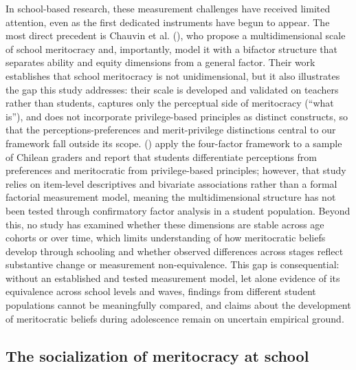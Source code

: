 \documentclass[
  13pt,
]{article}
\begin{document}
In school-based research, these measurement challenges have received
limited attention, even as the first dedicated instruments have begun to
appear. The most direct precedent is Chauvin et al.
(), who propose a
multidimensional scale of school meritocracy and, importantly, model it
with a bifactor structure that separates ability and equity dimensions
from a general factor. Their work establishes that school meritocracy is
not unidimensional, but it also illustrates the gap this study
addresses: their scale is developed and validated on teachers rather
than students, captures only the perceptual side of meritocracy (``what
is''), and does not incorporate privilege-based principles as distinct
constructs, so that the perceptions-preferences and merit-privilege
distinctions central to our framework fall outside its scope.
()
apply the four-factor framework to a sample of Chilean graders and
report that students differentiate perceptions from preferences and
meritocratic from privilege-based principles; however, that study relies
on item-level descriptives and bivariate associations rather than a
formal factorial measurement model, meaning the multidimensional
structure has not been tested through confirmatory factor analysis in a
student population. Beyond this, no study has examined whether these
dimensions are stable across age cohorts or over time, which limits
understanding of how meritocratic beliefs develop through schooling and
whether observed differences across stages reflect substantive change or
measurement non-equivalence. This gap is consequential: without an
established and tested measurement model, let alone evidence of its
equivalence across school levels and waves, findings from different
student populations cannot be meaningfully compared, and claims about
the development of meritocratic beliefs during adolescence remain on
uncertain empirical ground.

\subsection{The socialization of meritocracy at
school}\label{the-socialization-of-meritocracy-at-school}
\end{document}
